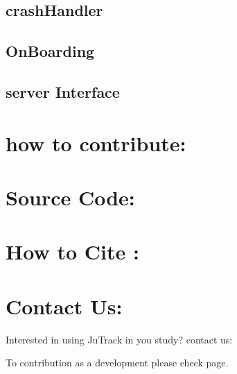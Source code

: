 \documentclass[letterpaper,10pt,english]{sphinxmanual}
\begin{document}
\section{crashHandler}
\label{\detokenize{developers:crashhandler}}

\section{OnBoarding}
\label{\detokenize{developers:onboarding}}

\section{server Interface}
\label{\detokenize{developers:server-interface}}

\chapter{how to contribute:}
\label{\detokenize{developers:how-to-contribute}}

\chapter{Source Code:}
\label{\detokenize{developers:source-code}}

\chapter{How to Cite :}
\label{\detokenize{index:how-to-cite}}

\chapter{Contact Us:}
\label{\detokenize{index:contact-us}}
Interested in using JuTrack in you study? contact us:

\begin{DUlineblock}{0em}
\item[] 
\end{DUlineblock}

To contribution as a development please check {\hyperref[\detokenize{developers::doc}]{}} page.



\renewcommand{\indexname}{Index}
\printindex
\end{document}
